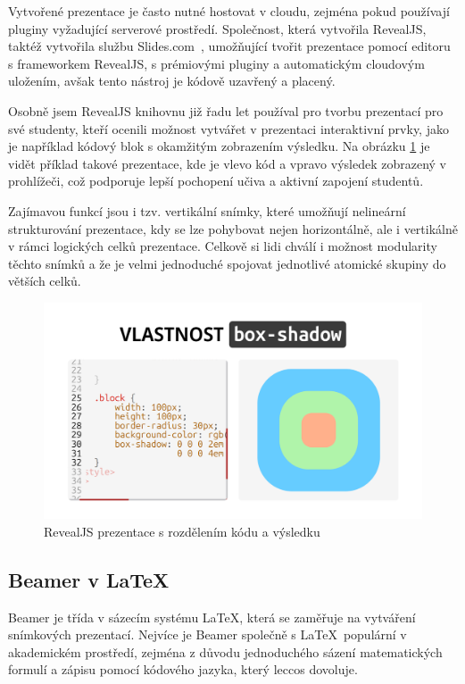 Vytvořené prezentace je často nutné hostovat v cloudu, zejména pokud používají pluginy vyžadující serverové prostředí.
Společnost, která vytvořila RevealJS, taktéž vytvořila službu Slides.com~\cite{revealjs, slidescom}, umožňující tvořit prezentace pomocí editoru s frameworkem RevealJS, s prémiovými pluginy a automatickým cloudovým uložením, avšak tento nástroj je kódově uzavřený a placený. 

Osobně jsem RevealJS knihovnu již řadu let používal pro tvorbu prezentací pro své studenty, kteří ocenili možnost vytvářet v prezentaci interaktivní prvky, jako je například kódový blok s okamžitým zobrazením výsledku. 
Na obrázku \ref{fig:analyza:revealjs-ukazka} je vidět příklad takové prezentace, kde je vlevo kód a vpravo výsledek zobrazený v prohlížeči, což podporuje lepší pochopení učiva a aktivní zapojení studentů. 

Zajímavou funkcí jsou i tzv. vertikální snímky, které umožňují nelineární strukturování prezentace, kdy se lze pohybovat nejen horizontálně, ale i vertikálně v rámci logických celků prezentace.
Celkově si lidi chválí i možnost modularity těchto snímků a že je velmi jednoduché spojovat jednotlivé atomické skupiny do větších celků.


\begin{figure}[h!]
    \centering
    \includegraphics[width=0.9\linewidth]{media/03_analyza/revealjs.png}
    \caption{RevealJS prezentace s rozdělením kódu a výsledku}
    \label{fig:analyza:revealjs-ukazka}
\end{figure}

\subsection{Beamer v \LaTeX}

Beamer je třída v sázecím systému \LaTeX, která se zaměřuje na vytváření snímkových prezentací.
Nejvíce je Beamer společně s \LaTeX~populární v akademickém prostředí, zejména z důvodu jednoduchého sázení matematických formulí a zápisu pomocí kódového jazyka, který leccos dovoluje. 

